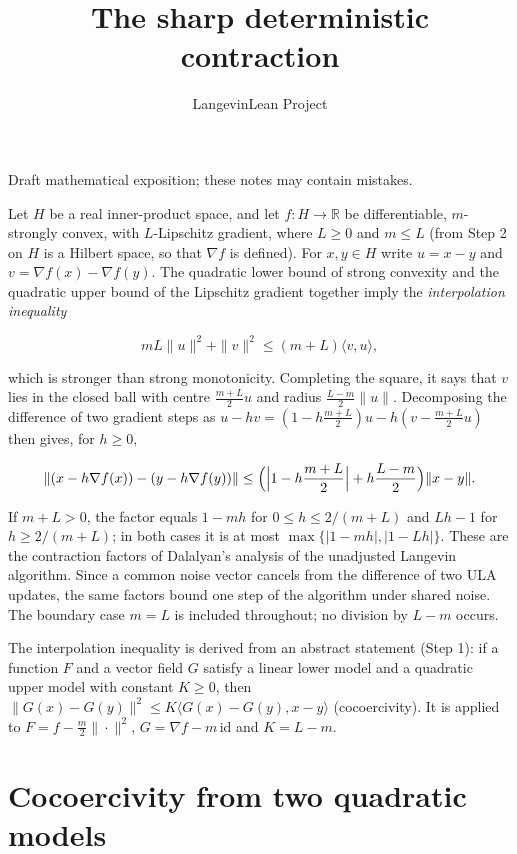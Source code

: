 \documentclass[11pt,a4paper]{article}
\title{\texorpdfstring{The sharp deterministic contraction}{The sharp deterministic contraction}}
\author{LangevinLean Project}
\date{}
\begin{document}
\maketitle
Draft mathematical exposition; these notes may contain mistakes.


Let \(H\) be a real inner-product space, and let \(f:H\to\mathbb R\) be differentiable, \(m\)-strongly convex, with \(L\)-Lipschitz gradient, where \(L\ge0\) and \(m\le L\) (from Step 2 on \(H\) is a Hilbert space, so that \(\nabla f\) is defined). For \(x,y\in H\) write \(u=x-y\) and \(v=\nabla f(x)-\nabla f(y)\). The quadratic lower bound of strong convexity and the quadratic upper bound of the Lipschitz gradient together imply the \emph{interpolation inequality}


\[mL\|u\|^2+\|v\|^2\le(m+L)\langle v,u\rangle,\]


which is stronger than strong monotonicity. Completing the square, it says that \(v\) lies in the closed ball with centre \(\frac{m+L}2u\) and radius \(\frac{L-m}2\|u\|\). Decomposing the difference of two gradient steps as \(u-hv=(1-h\frac{m+L}2)u-h(v-\frac{m+L}2u)\) then gives, for \(h\ge0\),


\[\|(x-h\nabla f(x))-(y-h\nabla f(y))\|\le\Bigl(\Bigl|1-h\frac{m+L}2\Bigr|+h\frac{L-m}2\Bigr)\|x-y\|.\]


If \(m+L>0\), the factor equals \(1-mh\) for \(0\le h\le2/(m+L)\) and \(Lh-1\) for \(h\ge2/(m+L)\); in both cases it is at most \(\max\{|1-mh|,|1-Lh|\}\). These are the contraction factors of Dalalyan's analysis of the unadjusted Langevin algorithm. Since a common noise vector cancels from the difference of two ULA updates, the same factors bound one step of the algorithm under shared noise. The boundary case \(m=L\) is included throughout; no division by \(L-m\) occurs.




The interpolation inequality is derived from an abstract statement (Step 1): if a function \(F\) and a vector field \(G\) satisfy a linear lower model and a quadratic upper model with constant \(K\ge0\), then \(\|G(x)-G(y)\|^2\le K\langle G(x)-G(y),x-y\rangle\) (cocoercivity). It is applied to \(F=f-\frac m2\|\cdot\|^2\), \(G=\nabla f-m\,\mathrm{id}\) and \(K=L-m\).


\section{\texorpdfstring{Cocoercivity from two quadratic models}{Cocoercivity from two quadratic models}}
\end{document}
